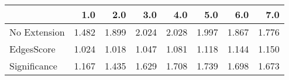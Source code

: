 \begin{tabular}{lrrrrrrr}
\toprule
{} &   1.0 &   2.0 &   3.0 &   4.0 &   5.0 &   6.0 &   7.0 \\
\midrule
No Extension & 1.482 & 1.899 & 2.024 & 2.028 & 1.997 & 1.867 & 1.776 \\
EdgesScore   & 1.024 & 1.018 & 1.047 & 1.081 & 1.118 & 1.144 & 1.150 \\
Significance & 1.167 & 1.435 & 1.629 & 1.708 & 1.739 & 1.698 & 1.673 \\
\bottomrule
\end{tabular}
